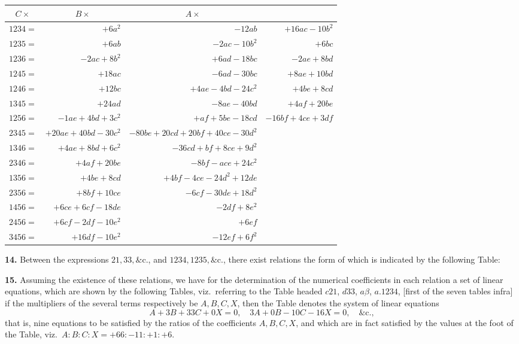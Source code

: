 \documentclass[11pt,a4paper]{article}
\begin{document}
\begin{center}
\begin{tabular}{r@{\;+\;}r@{\;+\;}r@{\;+\;}r}
\multicolumn{1}{c}{$C \times$} & \multicolumn{1}{c}{$B \times$} & \multicolumn{1}{c}{$A \times$} \\
\hline
$1234 =$ & $+6a^2$ & $-12ab$ & $+16ac - 10b^2$ \\
$1235 =$ & $+6ab$ & $-2ac - 10b^2$ & $+6bc$ \\
$1236 =$ & $-2ac + 8b^2$ & $+6ad - 18bc$ & $-2ae + 8bd$ \\
$1245 =$ & $+18ac$ & $-6ad - 30bc$ & $+8ae + 10bd$ \\
$1246 =$ & $+12bc$ & $+4ae - 4bd - 24c^2$ & $+4be + 8cd$ \\
$1345 =$ & $+24ad$ & $-8ae - 40bd$ & $+4af + 20be$ \\
$1256 =$ & $-1ae + 4bd + 3c^2$ & $+af + 5be - 18cd$ & $-16bf + 4ce + 3df$ \\
$2345 =$ & $+20ae + 40bd - 30c^2$ & $-80be + 20cd + 20bf + 40ce - 30d^2$ \\
$1346 =$ & $+4ae + 8bd + 6c^2$ & $-36cd + bf + 8ce + 9d^2$ \\
$2346 =$ & $+4af + 20be$ & $-8bf - ace + 24c^2$ \\
$1356 =$ & $+4be + 8cd$ & $+4bf - 4ce - 24d^2 + 12de$ \\
$2356 =$ & $+8bf + 10ce$ & $-6cf - 30de + 18d^2$ \\
$1456 =$ & $+6ce + 6cf - 18de$ & $-2df + 8e^2$ \\
$2456 =$ & $+6cf - 2df - 10e^2$ & $+6ef$ \\
$3456 =$ & $+16df - 10e^2$ & $-12ef + 6f^2$
\end{tabular}
\end{center}

\textbf{14.} Between the expressions $21, 33, \&\mathrm{c.}$, and $1234, 1235, \&\mathrm{c.}$, there exist relations the form of which is indicated by the following Table:

\newpage
\textbf{15.} Assuming the existence of these relations, we have for the determination of the numerical coefficients in each relation a set of linear equations, which are shown by the following Tables, viz.\ referring to the Table headed $c21$, $d33$, $a\beta$, $a.1234$, [first of the seven tables infra] if the multipliers of the several terms respectively be $A, B, C, X$, then the Table denotes the system of linear equations
\[
A + 3B + 33C + 0X = 0, \quad
3A + 0B - 10C - 16X = 0, \quad \&\mathrm{c.},
\]
that is, nine equations to be satisfied by the ratios of the coefficients $A, B, C, X$, and which are in fact satisfied by the values at the foot of the Table, viz.\ $A : B : C : X = +66 : -11 : +1 : +6$.
\end{document}
